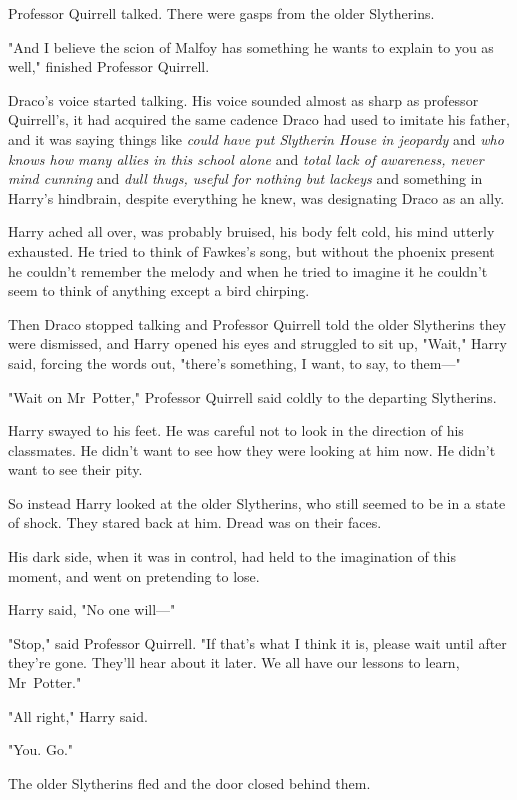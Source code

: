 Professor Quirrell talked. There were gasps from the older Slytherins.

"And I believe the scion of Malfoy has something he wants to explain to you as
well," finished Professor Quirrell.

Draco's voice started talking. His voice sounded almost as sharp as professor
Quirrell's, it had acquired the same cadence Draco had used to imitate his
father, and it was saying things like \emph{could have put Slytherin House in
jeopardy} and \emph{who knows how many allies in this school alone} and
\emph{total lack of awareness, never mind cunning} and \emph{dull thugs, useful
for nothing but lackeys} and something in Harry's hindbrain, despite everything
he knew, was designating Draco as an ally.

Harry ached all over, was probably bruised, his body felt cold, his mind
utterly exhausted. He tried to think of Fawkes's song, but without the phoenix
present he couldn't remember the melody and when he tried to imagine it he
couldn't seem to think of anything except a bird chirping.

Then Draco stopped talking and Professor Quirrell told the older Slytherins
they were dismissed, and Harry opened his eyes and struggled to sit up, "Wait,"
Harry said, forcing the words out, "there's something, I want, to say, to
them---"

"Wait on Mr~Potter," Professor Quirrell said coldly to the departing
Slytherins.

Harry swayed to his feet. He was careful not to look in the direction of his
classmates. He didn't want to see how they were looking at him now. He didn't
want to see their pity.

So instead Harry looked at the older Slytherins, who still seemed to be in a
state of shock. They stared back at him. Dread was on their faces.

His dark side, when it was in control, had held to the imagination of this
moment, and went on pretending to lose.

Harry said, "No one will---"

"Stop," said Professor Quirrell. "If that's what I think it is, please wait
until after they're gone. They'll hear about it later. We all have our lessons
to learn, Mr~Potter."

"All right," Harry said.

"You. Go."

The older Slytherins fled and the door closed behind them.

